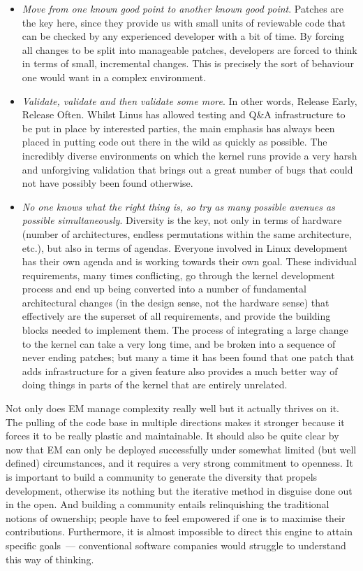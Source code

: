 \documentclass{memoir}
\begin{document}
\begin{itemize}
\item \emph{Move from one known good point to another known good
  point}. Patches are the key here, since they provide us with small
  units of reviewable code that can be checked by any experienced
  developer with a bit of time. By forcing all changes to be split
  into manageable patches, developers are forced to think in terms of
  small, incremental changes. This is precisely the sort of behaviour
  one would want in a complex environment.
\item \emph{Validate, validate and then validate some more}. In other
  words, Release Early, Release Often. Whilst Linus has allowed
  testing and Q\&A infrastructure to be put in place by interested
  parties, the main emphasis has always been placed in putting code
  out there in the wild as quickly as possible. The incredibly diverse
  environments on which the kernel runs provide a very harsh and
  unforgiving validation that brings out a great number of bugs that
  could not have possibly been found otherwise.
\item \emph{No one knows what the right thing is, so try as many
  possible avenues as possible simultaneously}. Diversity is the key,
  not only in terms of hardware (number of architectures, endless
  permutations within the same architecture, etc.), but also in terms
  of agendas. Everyone involved in Linux development has their own
  agenda and is working towards their own goal. These individual
  requirements, many times conflicting, go through the kernel
  development process and end up being converted into a number of
  fundamental architectural changes (in the design sense, not the
  hardware sense) that effectively are the superset of all
  requirements, and provide the building blocks needed to implement
  them. The process of integrating a large change to the kernel can
  take a very long time, and be broken into a sequence of never ending
  patches; but many a time it has been found that one patch that adds
  infrastructure for a given feature also provides a much better way
  of doing things in parts of the kernel that are entirely unrelated.
\end{itemize}

Not only does EM manage complexity really well but it actually thrives
on it. The pulling of the code base in multiple directions makes it
stronger because it forces it to be really plastic and
maintainable. It should also be quite clear by now that EM can only be
deployed successfully under somewhat limited (but well defined)
circumstances, and it requires a very strong commitment to
openness. It is important to build a community to generate the
diversity that propels development, otherwise its nothing but the
iterative method in disguise done out in the open. And building a
community entails relinquishing the traditional notions of ownership;
people have to feel empowered if one is to maximise their
contributions. Furthermore, it is almost impossible to direct this
engine to attain specific goals~--- conventional software companies
would struggle to understand this way of thinking.
\end{document}
